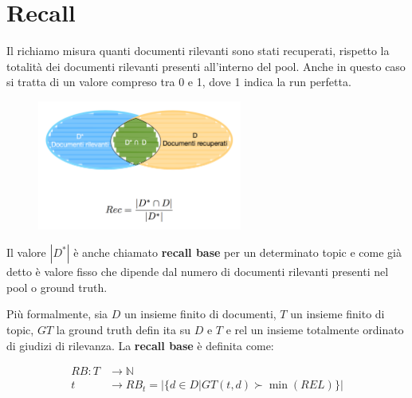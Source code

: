 

\section{Recall}

Il richiamo misura quanti documenti rilevanti sono stati recuperati, rispetto la totalità dei documenti rilevanti presenti all'interno del pool. Anche in questo caso si tratta di un valore compreso tra 0 e 1, dove 1 indica la run perfetta.

\begin{figure}[htbp]
	\centering
	\includegraphics[width=0.6\textwidth]{images/l15-fig-1.png}
\end{figure}

Il valore $|D^*|$ è anche chiamato \textbf{recall base} per un determinato topic e come già detto è valore fisso che dipende dal numero di documenti rilevanti presenti nel pool o ground truth.

Più formalmente, sia $D$ un insieme finito di documenti, $T$ un insieme finito di topic, $GT$ la ground truth defin ita su $D$ e $T$ e rel un insieme totalmente ordinato di giudizi di rilevanza. La \textbf{recall base} è definita come:

\begin{align*}
	RB : T &\to \mathbb{N} \\
		t &\to RB_t = \Big| \big\{ d \in D | GT(t,d) \succ \min(REL) \big\} \Big|
\end{align*}

